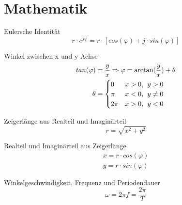 \documentclass[11pt,a4paper,draft, fleqn, twocolumn]{article}
\numberwithin{equation}{section}
\begin{document}
\section{Mathematik}

Eulersche Identität
\begin{equation}
    r \cdot e^{j\varphi} = r \cdot [cos(\varphi) + j \cdot sin(\varphi)]
\end{equation}

\noindent Winkel zwischen x und y Achse
\begin{equation}
\begin{split}
    tan(\varphi) & = \frac{y}{x} \Rightarrow \varphi = \arctan(\frac{y}{x})+\theta \\
    \theta & = 
    \begin{cases}
        0 & x > 0, \hspace{1ex} y > 0 \\
        \pi & x < 0, \hspace{1ex} y \neq  0 \\
        2\pi & x > 0, \hspace{1ex} y < 0
    \end{cases}
\end{split}
\end{equation}

\noindent Zeigerlänge aus Realteil und Imaginärteil
\begin{equation}
    r = \sqrt{x^2 + y^2}
\end{equation}

\noindent Realteil und Imaginärteil aus Zeigerlänge
\begin{equation}
\begin{split}
    x = r \cdot cos(\varphi) \\
    y = r \cdot sin(\varphi)
\end{split}
\end{equation}

\noindent Winkelgeschwindigkeit, Frequenz und Periodendauer
\begin{equation}
    \omega = 2\pi f = \frac{2\pi}{T}
\end{equation}
\end{document}
